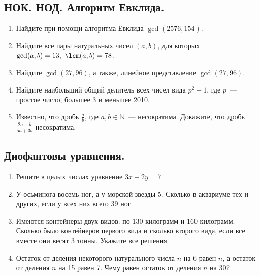 \documentclass[11pt]{article}
\begin{document}
    \subsection*{НОК. НОД. Алгоритм Евклида. }
    \begin{enumerate}[start=25,label={\bfseries \arabic*.}]
        \item Найдите при помощи алгоритма Евклида $\gcd(2576, 154)$.

        \item Найдите все пары натуральных чисел $(a, b)$, для которых $\gcd(a, b) = 13, \ \lcm(a, b) = 78$.

        \item Найдите $\gcd(27, 96)$, а также, линейное представление $\gcd(27, 96)$.

        \item Найдите наибольший общий делитель всех чисел вида $p^2 - 1$, где $p$~--- простое число, большее 3 и меньшее 2010.

        \item Известно, что дробь $\frac{a}{b}$, где $a, b \in \mathbb{N}$~--- несократима. Докажите, что дробь $\frac{2a + b}{5a + 3b}$ несократима.
    \end{enumerate}
    \subsection*{Диофантовы уравнения. }
    \begin{enumerate}[start=30,label={\bfseries \arabic*.}]
        \item Решите в целых числах уравнение $3x + 2y = 7$.

        \item У осьминога восемь ног, а у морской звезды 5. Сколько в аквариуме тех и других, если у всех них всего 39 ног.

        \item Имеются контейнеры двух видов: по 130 килограмм и 160 килограмм. Сколько было контейнеров первого вида и сколько второго вида,
              если все вместе они весят 3 тонны. Укажите все решения.

        \item Остаток от деления некоторого натурального числа $n$ на 6 равен $n$, а остаток от деления $n$ на 15 равен 7. Чему равен
              остаток от деления $n$ на 30?
    \end{enumerate}
\end{document}
